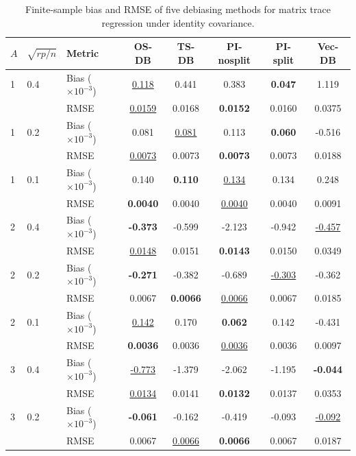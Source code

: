 \begin{table}[!htbp]
\centering
\caption{Finite-sample bias and RMSE of five debiasing methods for matrix trace regression under identity covariance.}
\label{tab:five-methods-ind}
\scriptsize
\begin{threeparttable}
\setlength{\tabcolsep}{4pt}
\begin{tabular}{lllccccc}
\toprule
$A$ & $\sqrt{rp/n}$ & Metric & OS-DB & TS-DB & PI-nosplit & PI-split & Vec-DB \\
\midrule
1 & 0.4 & Bias ($\times 10^{-3}$) & \underline{0.118} & 0.441 & 0.383 & \textbf{0.047} & 1.119 \\
 &  & RMSE & \underline{0.0159} & 0.0168 & \textbf{0.0152} & 0.0160 & 0.0375 \\
1 & 0.2 & Bias ($\times 10^{-3}$) & 0.081 & \underline{0.081} & 0.113 & \textbf{0.060} & -0.516 \\
 &  & RMSE & \underline{0.0073} & 0.0073 & \textbf{0.0073} & 0.0073 & 0.0188 \\
1 & 0.1 & Bias ($\times 10^{-3}$) & 0.140 & \textbf{0.110} & \underline{0.134} & 0.134 & 0.248 \\
 &  & RMSE & \textbf{0.0040} & 0.0040 & \underline{0.0040} & 0.0040 & 0.0091 \\
\midrule
2 & 0.4 & Bias ($\times 10^{-3}$) & \textbf{-0.373} & -0.599 & -2.123 & -0.942 & \underline{-0.457} \\
 &  & RMSE & \underline{0.0148} & 0.0151 & \textbf{0.0143} & 0.0150 & 0.0349 \\
2 & 0.2 & Bias ($\times 10^{-3}$) & \textbf{-0.271} & -0.382 & -0.689 & \underline{-0.303} & -0.362 \\
 &  & RMSE & 0.0067 & \textbf{0.0066} & \underline{0.0066} & 0.0067 & 0.0185 \\
2 & 0.1 & Bias ($\times 10^{-3}$) & \underline{0.142} & 0.170 & \textbf{0.062} & 0.142 & -0.431 \\
 &  & RMSE & \textbf{0.0036} & 0.0036 & \underline{0.0036} & 0.0036 & 0.0097 \\
\midrule
3 & 0.4 & Bias ($\times 10^{-3}$) & \underline{-0.773} & -1.379 & -2.062 & -1.195 & \textbf{-0.044} \\
 &  & RMSE & \underline{0.0134} & 0.0141 & \textbf{0.0132} & 0.0137 & 0.0353 \\
3 & 0.2 & Bias ($\times 10^{-3}$) & \textbf{-0.061} & -0.162 & -0.419 & -0.093 & \underline{-0.092} \\
 &  & RMSE & 0.0067 & \underline{0.0066} & \textbf{0.0066} & 0.0067 & 0.0187 \\

\end{tabular}
\end{threeparttable}
\end{table}
